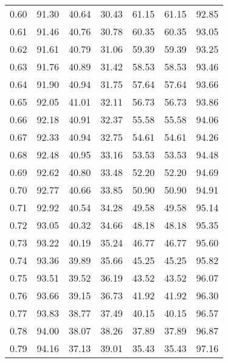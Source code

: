 \begin{tabular}{|c|c|c|c|c|c|c|}
      0.60 &     91.30 &     40.64 &      30.43 &   61.15 &      61.15 &         92.85 \\
      0.61 &     91.46 &     40.76 &      30.78 &   60.35 &      60.35 &         93.05 \\
      0.62 &     91.61 &     40.79 &      31.06 &   59.39 &      59.39 &         93.25 \\
      0.63 &     91.76 &     40.89 &      31.42 &   58.53 &      58.53 &         93.46 \\
      0.64 &     91.90 &     40.94 &      31.75 &   57.64 &      57.64 &         93.66 \\
      0.65 &     92.05 &     41.01 &      32.11 &   56.73 &      56.73 &         93.86 \\
      0.66 &     92.18 &     40.91 &      32.37 &   55.58 &      55.58 &         94.06 \\
      0.67 &     92.33 &     40.94 &      32.75 &   54.61 &      54.61 &         94.26 \\
      0.68 &     92.48 &     40.95 &      33.16 &   53.53 &      53.53 &         94.48 \\
      0.69 &     92.62 &     40.80 &      33.48 &   52.20 &      52.20 &         94.69 \\
      0.70 &     92.77 &     40.66 &      33.85 &   50.90 &      50.90 &         94.91 \\
      0.71 &     92.92 &     40.54 &      34.28 &   49.58 &      49.58 &         95.14 \\
      0.72 &     93.05 &     40.32 &      34.66 &   48.18 &      48.18 &         95.35 \\
      0.73 &     93.22 &     40.19 &      35.24 &   46.77 &      46.77 &         95.60 \\
      0.74 &     93.36 &     39.89 &      35.66 &   45.25 &      45.25 &         95.82 \\
      0.75 &     93.51 &     39.52 &      36.19 &   43.52 &      43.52 &         96.07 \\
      0.76 &     93.66 &     39.15 &      36.73 &   41.92 &      41.92 &         96.30 \\
      0.77 &     93.83 &     38.77 &      37.49 &   40.15 &      40.15 &         96.57 \\
      0.78 &     94.00 &     38.07 &      38.26 &   37.89 &      37.89 &         96.87 \\
      0.79 &     94.16 &     37.13 &      39.01 &   35.43 &      35.43 &         97.16 \\

\end{tabular}
